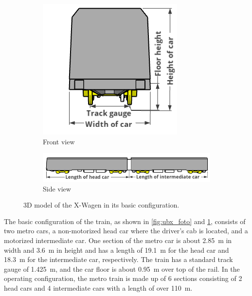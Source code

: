 \begin{figure}[H]
	\centering
	\begin{subfigure}[b]{\textwidth}
		\centering
		\includegraphics{fig/UBX_front_view_with_label_smaller.PNG}
		\caption{Front view}
	\end{subfigure}

	\begin{subfigure}[b]{\textwidth}
		\centering
		\includegraphics{fig/UBX_sketchup_model_side_view_with_label_2.PNG}
		\caption{Side view}
		\label{fig:ubx_model_sideview}
	\end{subfigure}
	
	\caption{3D model of the X-Wagen in its basic configuration.}
	\label{fig:ubx_sketup_model}
\end{figure}

The basic configuration of the train, as shown in \cref{fig:ubx_foto} and \cref{fig:ubx_model_sideview}, consists of two metro cars, a non-motorized head car where the driver's cab is located, and a motorized intermediate car. One section of the metro car is about \SI{2.85}{\meter} in width and \SI{3.6}{\meter} in height and has a length of \SI{19.1}{\meter} for the head car and \SI{18.3}{\meter} for the intermediate car, respectively. The train has a standard track gauge of \SI{1.425}{\meter}, and the car floor is about \SI{0.95}{\meter} over top of the rail. In the operating configuration, the metro train is made up of 6 sections consisting of 2 head cars and 4 intermediate cars with a length of over \SI{110}{\meter}.

